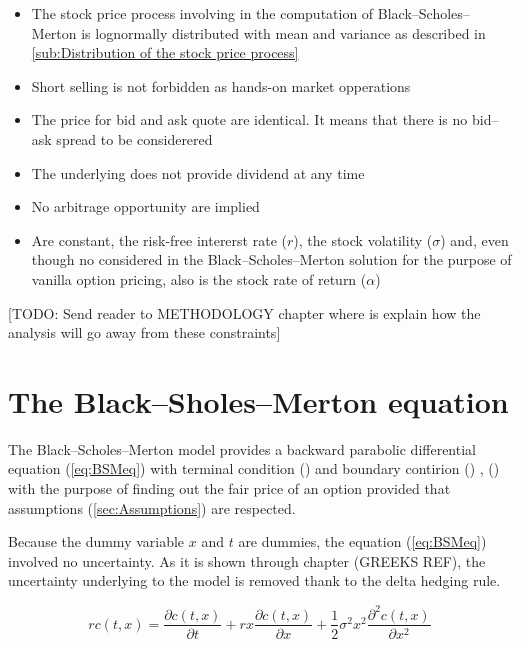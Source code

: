 \documentclass[12pt]{report}
\newcommand{\call}[2]{c\left( #1, #2\right)}
\newcommand{\BSMeq}[1]{r\call{t}{#1} = \frac{\partial \call{t}{#1}}{\partial t} + r #1 \frac{\partial \call{t}{#1}}{\partial #1} + \frac{1}{2} \sigma ^2 #1 ^2 \frac{\partial ^2 \call{t}{#1}}{\partial #1 ^2}}
\begin{document}
\begin{itemize}
  \item The stock price process involving in the computation of Black--Scholes--Merton is lognormally distributed with mean and variance as described in \ref{sub:Distribution of the stock price process}
  \item Short selling is not forbidden as hands-on market opperations
  \item The price for bid and ask quote are identical. It means that there is no bid--ask spread to be considerered
  \item The underlying does not provide dividend at any time
  \item No arbitrage opportunity are implied
  \item Are constant, the risk-free intererst rate ($r$), the stock volatility ($\sigma$) and, even though no considered in the Black--Scholes--Merton solution for the purpose of vanilla option pricing, also is the stock rate of return ($\alpha$)
\end{itemize}

[TODO: Send reader to METHODOLOGY chapter where is explain how the analysis will go away from these constraints]

\section{The Black--Sholes--Merton equation}
\label{sec:The partial differential BSM equation}

The Black--Scholes--Merton model provides a backward parabolic differential equation (\ref{eq:BSMeq}) with terminal condition () and boundary contirion () , () with the purpose of finding out the fair price of an option provided that assumptions (\ref{sec:Assumptions}) are respected. 

Because the dummy variable $x$ and $t$ are dummies, the equation (\ref{eq:BSMeq}) involved no uncertainty. As it is shown through chapter (GREEKS REF), the uncertainty underlying to the model is removed thank to the delta hedging rule.

\begin{center}
  \begin{equation}
     \BSMeq{x}
    \label{eq:BSMeq}
  \end{equation}
\end{center}
\end{document}
